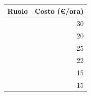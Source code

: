 \documentclass[12pt,a4paper]{article}
\begin{document}
\begin{table}[H]
	\begin{center}
		\begin{tabular}{l r}
			\toprule
            \textbf{Ruolo}	& \textbf{Costo (\euro/ora)} \\ \midrule
			\midrule
            \RE{} & 30 \\ \midrule
            \AM{} & 20 \\ \midrule
            \AN{} & 25 \\ \midrule
            \PG{} & 22 \\ \midrule
            \PR{} & 15 \\ \midrule
            \VR{} & 15 \\
			\bottomrule
		\end{tabular}
	\end{center}
\end{table}

\newpage
\printglossary[title={Glossario}]
\end{document}
